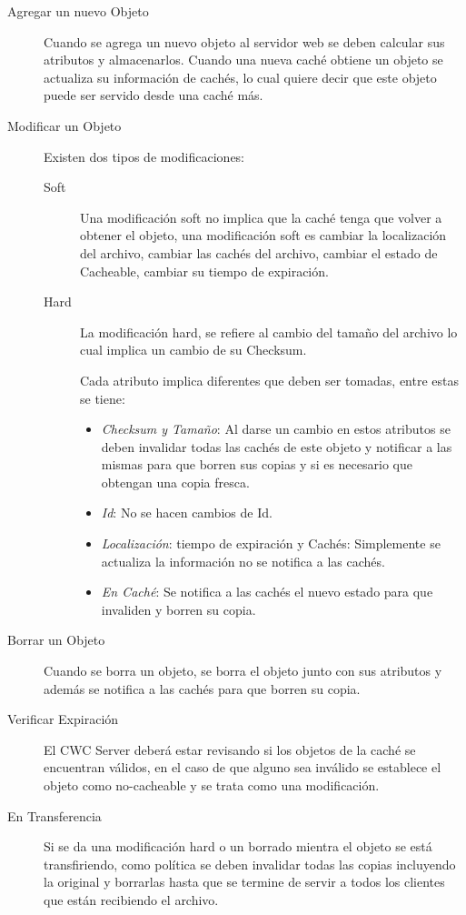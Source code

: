 \begin{description}

\item[Agregar un nuevo Objeto] Cuando se agrega un nuevo objeto al servidor web se deben calcular sus atributos y almacenarlos. Cuando una nueva caché obtiene un objeto se actualiza su información de cachés, lo cual quiere decir que este objeto puede ser servido desde una caché más.

\item [Modificar un Objeto] Existen dos tipos de modificaciones: 
	\begin{description}
	\item[Soft] Una modificación soft no implica que la caché tenga que volver a obtener el objeto, una modificación soft es cambiar la localización del archivo, cambiar las cachés del archivo, cambiar el estado de Cacheable, cambiar su tiempo de expiración.
	\item [Hard] La modificación hard, se refiere al cambio del tamaño del archivo lo cual implica un cambio de su Checksum.

Cada atributo implica diferentes que deben ser tomadas, entre estas se tiene:

		\begin{itemize}
		\item \textit{Checksum y Tamaño}: Al darse un cambio en estos atributos se deben invalidar todas las cachés de este objeto y notificar a las mismas para que borren sus copias y si es necesario que obtengan una copia fresca.
		\item \textit{Id}: No se hacen cambios de Id.
		\item \textit{Localización}: tiempo de expiración y Cachés: Simplemente se actualiza la información no se notifica a las cachés.
		\item \textit{En Caché}: Se notifica a las cachés el nuevo estado para que invaliden y borren su copia.
		\end{itemize}

\end{description}

\item [Borrar un Objeto] Cuando se borra un objeto, se borra el objeto junto con sus atributos y además se notifica a las cachés para que borren su copia.

\item [Verificar Expiración] El CWC Server deberá estar revisando si los objetos de la caché se encuentran válidos, en el caso de que alguno sea inválido se establece el objeto como no-cacheable y se trata como una modificación. 

\item [En Transferencia] Si se da una modificación hard o un borrado mientra el objeto se está transfiriendo, como política se deben invalidar todas las copias incluyendo la original y borrarlas hasta que se termine de servir a todos los clientes que están recibiendo el archivo.

\end{description}

